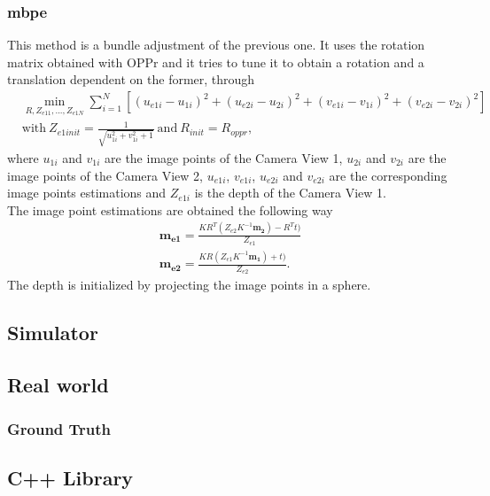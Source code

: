 \subsubsection{\acrlong{mbpe}}
\label{MBaPE}
This method is a bundle adjustment of the previous one. It uses the rotation matrix obtained with OPPr and it tries to tune it to obtain a rotation and a translation dependent on the former, through 
\begin{align*}
	& \min_{R, Z_{e11}, ..., Z_{e1N}} \sum^N_{i=1} [(u_{e1i}-u_{1i})^2 + (u_{e2i}-u_{2i})^2 + (v_{e1i}-v_{1i})^2 + (v_{e2i}-v_{2i})^2]\\
	& \text{with} \ Z_{e1init} = \frac{1}{\sqrt{u_{1i}^2 + v_{1i}^2 + 1}} \ \text{and} \ R_{init} = R_{oppr},
\end{align*}
where $u_{1i}$ and $v_{1i}$ are the image points of the Camera View 1, $u_{2i}$ and $v_{2i}$ are the image points of the Camera View 2, $u_{e1i}$, $v_{e1i}$, $u_{e2i}$ and $v_{e2i}$ are the corresponding image points estimations and $Z_{e1i}$ is the depth of the Camera View 1.\\
The image point estimations are obtained the following way
\begin{align*}
	\mathbf{m_{e1}} = \frac{KR^T(Z_{e2}K^{-1}\mathbf{m_2}) - R^Tt)}{Z_{e1}}\\
	\mathbf{m_{e2}} = \frac{KR(Z_{e1}K^{-1}\mathbf{m_1}) + t)}{Z_{e2}}.
\end{align*} The depth is initialized by projecting the image points in a sphere.

\subsection{Simulator}

\subsection{Real world}

\subsubsection{Ground Truth}

\subsection{C++ Library}
